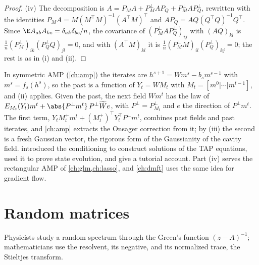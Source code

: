 \begin{refsection}
\begin{proof}
(iv) The decomposition is $A=P_MA+P_M^\perp AP_Q+P_M^\perp AP_Q^\perp$, rewritten with the identities $P_MA=M(M^\top M)^{-1}(A^\top M)^\top$ and $AP_Q=AQ(Q^\top Q)^{-1}Q^\top$. Since $\E A_{ab}A_{kc}=\delta_{ak}\delta_{bc}/n$, the covariance of $(P_M^\perp AP_Q^\perp)_{ij}$ with $(AQ)_{kl}$ is $\frac1n(P_M^\perp)_{ik}(P_Q^\perp Q)_{jl}=0$, and with $(A^\top M)_{kl}$ it is $\frac1n(P_M^\perp M)_{il}(P_Q^\perp)_{kj}=0$; the rest is as in (i) and (ii).
\end{proof}

In symmetric AMP (\cref{ch:amp}) the iterates are $h^{s+1}=Wm^s-b_sm^{s-1}$ with $m^s=f_s(h^s)$, so the past is a function of $Y_t=WM_t$ with $M_t=[m^0|\cdots|m^{t-1}]$, and (ii) applies. Given the past, the next field $Wm^t$ has the law of $E_{M_t}(Y_t)m^t+\abs{P^\perp m^t}\,P^\perp\widetilde We$, with $P^\perp=P_{M_t}^\perp$ and $e$ the direction of $P^\perp m^t$. The first term, $Y_tM_t^+m^t+(M_t^+)^\top Y_t^\top P^\perp m^t$, combines past fields and past iterates, and \cref{ch:amp} extracts the Onsager correction from it; by (iii) the second is a fresh Gaussian vector, the rigorous form of the Gaussianity of the cavity field. \Textcite{Bolthausen2014} introduced the conditioning to construct solutions of the TAP equations, \textcite{BayatiMontanari2011} used it to prove state evolution, and \textcite{FengEtAl2022} give a tutorial account. Part (iv) serves the rectangular AMP of \cref{ch:glm,ch:lasso}, and \cref{ch:dmft} uses the same idea for gradient flow.

\section{Random matrices}\label{sec:toolkit:rmt}

Physicists study a random spectrum through the Green's function $(z-A)^{-1}$; mathematicians use the resolvent, its negative, and its normalized trace, the Stieltjes transform.


\end{refsection}
